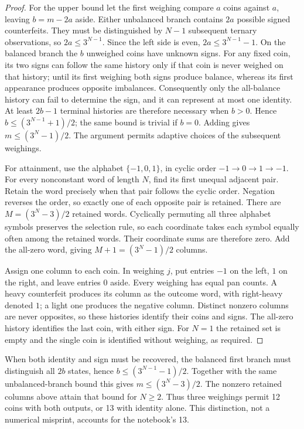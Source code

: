 \begin{proof}
For the upper bound let the first weighing compare \(a\) coins against
\(a\), leaving \(b=m-2a\) aside.  Either unbalanced branch contains
\(2a\) possible signed counterfeits.  They must be distinguished by
\(N-1\) subsequent ternary observations, so
\(2a\leq3^{N-1}\).  Since the left side is even,
\(2a\leq3^{N-1}-1\).  On the balanced branch the \(b\) unweighed coins
have unknown signs.  For any fixed coin, its two signs can follow the same
history only if that coin is never weighed on that history; until its first
weighing both signs produce balance, whereas its first appearance produces
opposite imbalances.  Consequently only the all-balance history can fail to
determine the sign, and it can represent at most one identity.  At least
\(2b-1\) terminal histories are therefore necessary when \(b>0\).
Hence \(b\leq(3^{N-1}+1)/2\); the same bound is trivial if \(b=0\).
Adding gives \(m\leq(3^N-1)/2\).  The argument permits adaptive choices
of the subsequent weighings.

For attainment, use the alphabet \(\{-1,0,1\}\), in cyclic order
\(-1\to0\to1\to-1\).  For every nonconstant word of length \(N\),
find its first unequal adjacent pair.  Retain the word precisely when that
pair follows the cyclic order.  Negation reverses the order, so exactly one
of each opposite pair is retained.  There are
\(M=(3^N-3)/2\) retained words.  Cyclically permuting all three alphabet
symbols preserves the selection rule, so each coordinate takes each symbol
equally often among the retained words.  Their coordinate sums are therefore
zero.  Add the all-zero word, giving \(M+1=(3^N-1)/2\) columns.

Assign one column to each coin.  In weighing \(j\), put entries \(-1\)
on the left, \(1\) on the right, and leave entries \(0\) aside.  Every
weighing has equal pan counts.  A heavy counterfeit produces its column as
the outcome word, with right-heavy denoted \(1\); a light one produces the
negative column.  Distinct nonzero columns are never opposites, so these
histories identify their coins and signs.  The all-zero history identifies
the last coin, with either sign.  For \(N=1\) the retained set is empty and
the single coin is identified without weighing, as required.
\end{proof}

\begin{remark}\ours
When both identity and sign must be recovered, the balanced first branch
must distinguish all \(2b\) states, hence
\(b\leq(3^{N-1}-1)/2\).  Together with the same unbalanced-branch bound
this gives \(m\leq(3^N-3)/2\).  The nonzero retained columns above attain
that bound for \(N\geq2\).  Thus three weighings permit 12 coins with
both outputs, or 13 with identity alone.  This distinction, not a numerical
misprint, accounts for the notebook's 13.
\end{remark}


